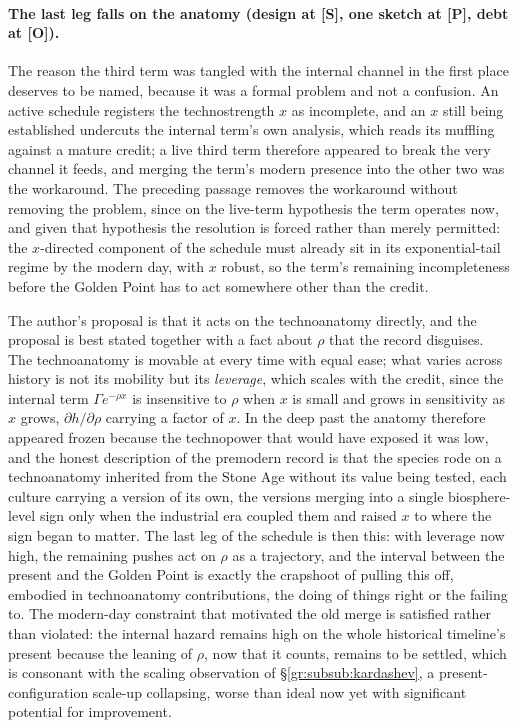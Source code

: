 \documentclass[11pt]{article}
\theoremstyle{plain}
\theoremstyle{definition}
\theoremstyle{remark}
\begin{document}
\paragraph{The last leg falls on the anatomy (design at \textbf{[S]},
one sketch at \textbf{[P]}, debt at \textbf{[O]}).}\label{sch:rem:anatomyleg}
The reason the third term was tangled with the internal channel in
the first place deserves to be named, because it was a formal
problem and not a confusion. An active schedule registers the
technostrength $x$ as incomplete, and an $x$ still being established
undercuts the internal term's own analysis, which reads its muffling
against a mature credit; a live third term therefore appeared to
break the very channel it feeds, and merging the term's modern
presence into the other two was the workaround. The preceding
passage removes the workaround without removing the problem, since
on the live-term hypothesis the term operates now, and given that
hypothesis the resolution is forced rather than merely permitted:
the $x$-directed component of the schedule must already sit in its
exponential-tail regime by the modern day, with $x$ robust, so the
term's remaining incompleteness before the Golden Point has to act
somewhere other than the credit.

The author's proposal is that it acts on the technoanatomy
directly, and the proposal is best stated together with a fact
about $\rho$ that the record disguises. The technoanatomy is
movable at every time with equal ease; what varies across history is
not its mobility but its \emph{leverage}, which scales with the
credit, since the internal term $\Gamma e^{-\rho x}$ is insensitive
to $\rho$ when $x$ is small and grows in sensitivity as $x$ grows,
$\partial h/\partial\rho$ carrying a factor of $x$. In the deep past
the anatomy therefore appeared frozen because the technopower that
would have exposed it was low, and the honest description of the
premodern record is that the species rode on a technoanatomy
inherited from the Stone Age without its value being tested, each
culture carrying a version of its own, the versions merging into a
single biosphere-level sign only when the industrial era coupled
them and raised $x$ to where the sign began to matter. The last leg
of the schedule is then this: with leverage now high, the remaining
pushes act on $\rho$ as a trajectory, and the interval between the
present and the Golden Point is exactly the crapshoot of pulling
this off, embodied in technoanatomy contributions, the doing of
things right or the failing to. The modern-day constraint that
motivated the old merge is satisfied rather than violated: the
internal hazard remains high on the whole historical timeline's
present because the leaning of $\rho$, now that it counts, remains
to be settled, which is consonant with the scaling observation of
\S\ref{gr:subsub:kardashev}, a present-configuration scale-up
collapsing, worse than ideal now yet with significant potential for
improvement.
\end{document}
